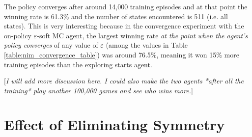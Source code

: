 \documentclass[11pt,a4paper]{report}
\begin{document}
The policy converges after around 14,000 training episodes and at that point the winning rate is 61.3\% and the number of states encountered is 511 (i.e. all states). This is very interesting because in the convergence experiment with the on-policy $\varepsilon$-soft MC agent, the largest winning rate \emph{at the point when the agent's policy converges} of any value of $\varepsilon$ (among the values in Table \ref{table:nim_convergence_table}) was around 76.5\%, meaning it won 15\% more training episodes than the exploring starts agent.

[\emph{I will add more discussion here. I could also make the two agents *after all the training* play another 100,000 games and see who wins more.}]


\section{Effect of Eliminating Symmetry}
\end{document}
